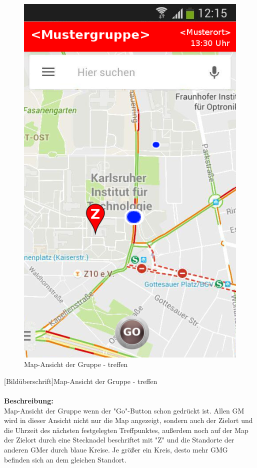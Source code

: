 \begin{figure}
	\caption{Map-Ansicht der Gruppe - treffen}
\begin{center}
	\includegraphics[scale =0.5]{resources/images/map_Go.png}
\end{center}
\end{figure}
[Bildüberschrift]Map-Ansicht der Gruppe - treffen\\ \\
\textbf{Beschreibung:}\\
Map-Ansicht der Gruppe wenn der "Go"-Button schon gedrückt ist. Allen GM wird in dieser Ansicht nicht nur die Map angezeigt, sondern auch der Zielort und die Uhrzeit des nächsten festgelegten Treffpunktes, außerdem noch auf der Map der Zielort durch eine Stecknadel beschriftet mit "Z" und die Standorte der anderen GMer durch blaue Kreise. Je größer ein Kreis, desto mehr GMG befinden sich an dem gleichen Standort.\\
